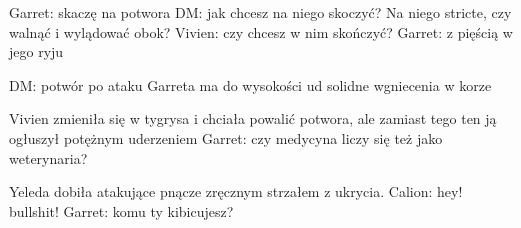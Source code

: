 \documentclass[10pt,twoside,twocolumn]{book}
\begin{document}
%    
%       
Garret: skaczę na potwora
DM: jak chcesz na niego skoczyć? Na niego stricte, czy walnąć i wylądować obok?
Vivien: czy chcesz w nim skończyć?
Garret: z pięścią w jego ryju

%    
%       
DM: potwór po ataku Garreta ma do wysokości ud solidne wgniecenia w korze

%    
%       
Vivien zmieniła się w tygrysa i chciała powalić potwora, ale zamiast tego ten ją ogłuszył potężnym uderzeniem
Garret: czy medycyna liczy się też jako weterynaria?

%    
%       
Yeleda dobiła atakujące pnącze zręcznym strzałem z ukrycia.
Calion: hey! bullshit!
Garret: komu ty kibicujesz?
\end{document}
